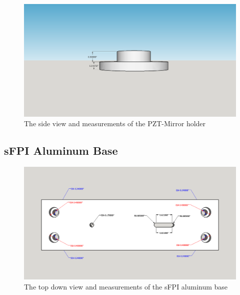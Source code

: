 \documentclass[12pt,journal]{IEEEtran}
\begin{document}
\begin{appendices}
\begin{figure}[h!]
  \centering
	\includegraphics[width=\textwidth]{./mechanical/PZT_holder_side.png}
	\caption[Cavity Mounts]{The side view and measurements of the PZT-Mirror holder}
	\label{fig:PZT-holder-side}
\end{figure}  

\newpage

\subsection{sFPI Aluminum Base} \label{ss:sfpilensholder}

\begin{figure}[h!]
  \centering
	\includegraphics[width=\textwidth]{./mechanical/sfpilensholder_top.png}
	\caption[Cavity Mounts]{The top down view and measurements of the sFPI aluminum base}
	\label{fig:sfpilensholder-top}
\end{figure}  


\end{appendices}
\end{document}
